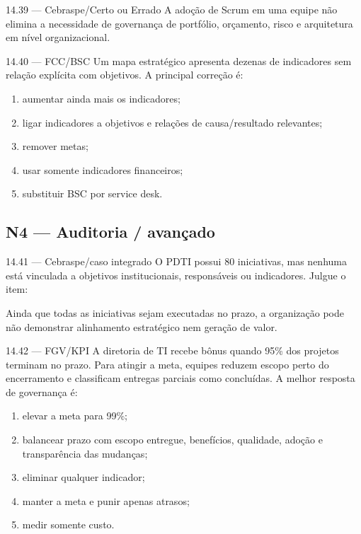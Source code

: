\begin{questao}{ 14.39 — Cebraspe/Certo ou Errado}
A adoção de Scrum em uma equipe não elimina a necessidade de governança de portfólio, orçamento, risco e arquitetura em nível organizacional.
\end{questao}

\begin{questao}{ 14.40 — FCC/BSC}
Um mapa estratégico apresenta dezenas de indicadores sem relação explícita com objetivos. A principal correção é:
\begin{enumerate}[label=\Alph*)]
\item aumentar ainda mais os indicadores;
\item ligar indicadores a objetivos e relações de causa/resultado relevantes;
\item remover metas;
\item usar somente indicadores financeiros;
\item substituir BSC por service desk.
\end{enumerate}
\end{questao}

\subsection*{N4 — Auditoria / avançado}

\begin{questao}{ 14.41 — Cebraspe/caso integrado}
O PDTI possui 80 iniciativas, mas nenhuma está vinculada a objetivos institucionais, responsáveis ou indicadores. Julgue o item:

Ainda que todas as iniciativas sejam executadas no prazo, a organização pode não demonstrar alinhamento estratégico nem geração de valor.
\end{questao}

\begin{questao}{ 14.42 — FGV/KPI}
A diretoria de TI recebe bônus quando 95\% dos projetos terminam no prazo. Para atingir a meta, equipes reduzem escopo perto do encerramento e classificam entregas parciais como concluídas. A melhor resposta de governança é:
\begin{enumerate}[label=\Alph*)]
\item elevar a meta para 99\%;
\item balancear prazo com escopo entregue, benefícios, qualidade, adoção e transparência das mudanças;
\item eliminar qualquer indicador;
\item manter a meta e punir apenas atrasos;
\item medir somente custo.
\end{enumerate}
\end{questao}

